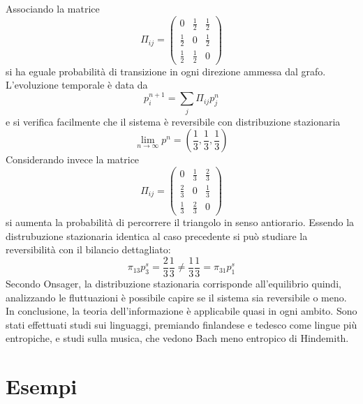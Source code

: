 \documentclass[12pt, a4paper]{book}
\theoremstyle{theorem}
\begin{document}
				Associando la matrice
				\begin{equation*}
					\Pi_{ij} = 
						\begin{pmatrix}
							0 & \frac{1}{2} & \frac{1}{2} \\
							\frac{1}{2} & 0 & \frac{1}{2} \\
							\frac{1}{2} & \frac{1}{2} & 0 
						\end{pmatrix}
				\end{equation*}
				si ha eguale probabilità di transizione in ogni direzione ammessa dal grafo.
				L'evoluzione temporale è data da
				\begin{equation*}
					p_i^{n+1}=\sum_j\Pi_{ij}p_j^n
				\end{equation*}
				e si verifica facilmente che il sistema è reversibile con distribuzione stazionaria
				\begin{equation*}
					\lim_{n\to\infty}p^n=\left(\frac{1}{3},\frac{1}{3},\frac{1}{3}\right)
				\end{equation*}
				Considerando invece la matrice
				\begin{equation*}
					\Pi_{ij} = 
						\begin{pmatrix}
							0 & \frac{1}{3} & \frac{2}{3} \\
							\frac{2}{3} & 0 & \frac{1}{3} \\
							\frac{1}{3} & \frac{2}{3} & 0 
						\end{pmatrix}
				\end{equation*}
				si aumenta la probabilità di percorrere il triangolo in senso antiorario.
				Essendo la distrubuzione stazionaria identica al caso precedente si può studiare la reversibilità con il bilancio dettagliato:
				\begin{equation*}
					\pi_{13}p_3^s = \frac{2}{3} \frac{1}{3} \neq \frac{1}{3}\frac{1}{3} = \pi_{31}p_1^s
				\end{equation*}
				Secondo Onsager, la distribuzione stazionaria corrisponde all'equilibrio quindi, analizzando le fluttuazioni è possibile capire se il sistema sia reversibile o meno.
				\\
				In conclusione, la teoria dell'informazione è applicabile quasi in ogni ambito.
				Sono stati effettuati studi sui linguaggi, premiando finlandese e tedesco come lingue più entropiche, e studi sulla musica, che vedono Bach meno entropico di Hindemith.
		
		\section{Esempi}
\end{document}
